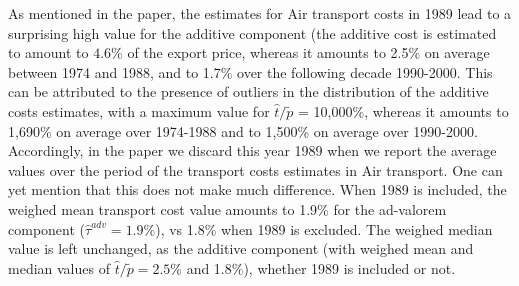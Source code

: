 \documentclass[11pt,twoside, authoryear]{elsarticle}
\begin{document}
As mentioned in the paper, the estimates for Air transport costs in 1989 lead to a surprising high value for the additive component (the additive cost is estimated to amount to $4.6\%$ of the export price, whereas it amounts to 2.5\% on average between 1974 and 1988, and to 1.7\% over the following decade 1990-2000. This can be attributed to the presence of outliers in the distribution of the additive costs estimates, with a maximum value for $\widehat{t}/\widetilde{p}$ = 10,000\%, whereas it amounts to 1,690\% on average over 1974-1988 and to 1,500\% on average over 1990-2000. Accordingly, in the paper we discard this year 1989 when we report the average values over the period of the transport costs estimates in Air transport. One can yet mention that this does not make much difference. When 1989 is included, the weighed mean transport cost value amounts to 1.9\% for the ad-valorem component ($\widehat{\tau}^{adv} = 1.9\%$), vs 1.8\% when 1989 is excluded. The weighed median value is left unchanged, as the additive component (with weighed mean and median values of $\widehat{t}/\widetilde{p} = 2.5\%$ and 1.8\%), whether 1989 is included or not.
\end{document}
